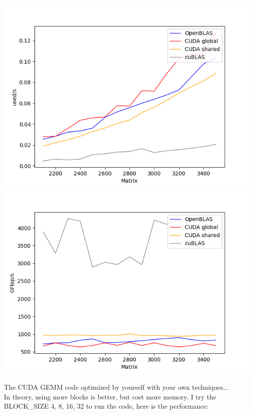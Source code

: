 \documentclass[12pt]{ctexart}
\begin{document}
\includegraphics[scale=0.5]{2s}
\includegraphics[scale=0.5]{2g}

\newpage

The CUDA GEMM code optimized by yourself with your own techniques...
\\In theory, using more blocks is better, but cost more memory. I try the BLOCK\_SIZE 4, 8, 16, 32 to run the code, here is the performance:
\end{document}
